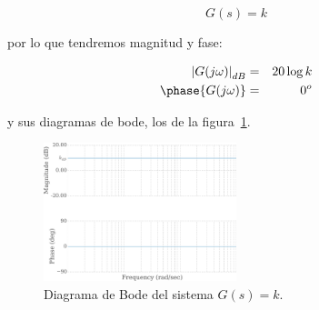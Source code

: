         \begin{equation*}
            G(s) = k
        \end{equation*}

        por lo que tendremos magnitud y fase:

        \begin{eqnarray*}
            \left| G(j \omega) \right|_{dB} & = & 20 \log{k} \\
            \phase{G(j \omega)} & = & 0^o
        \end{eqnarray*}

        y sus diagramas de bode, los de la figura~\ref{fig:bodeordencero}.

        \begin{figure}
            \centering
            \includegraphics[width=0.5\textwidth]{./imagenes/bodeordencero.pdf}
            \caption{\label{fig:bodeordencero}Diagrama de Bode del sistema $G(s) = k$.}
        \end{figure}
